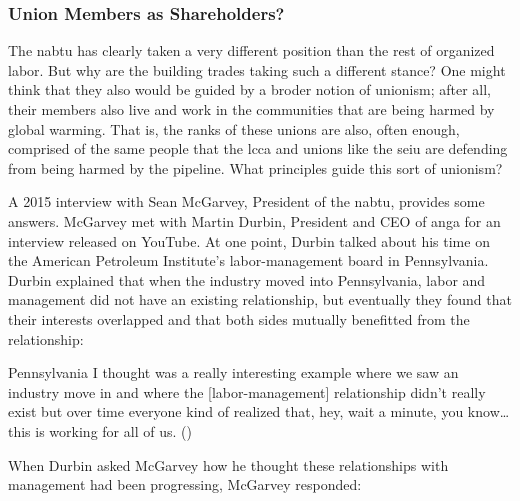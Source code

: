 \documentclass[12pt]{article}
\renewenvironment{quote}
  {\list{}{\leftmargin=\parindent\rightmargin=0pt}%
   \item\relax}
  {\endlist}
\begin{document}
\subsubsection{Union Members as Shareholders?}

The \acrfull{nabtu} has clearly taken a very different position than the rest of organized labor. But why are the building trades taking such a different stance? One might think that they also would be guided by a broder notion of unionism; after all, their members also live and work in the communities that are being harmed by global warming. That is, the ranks of these unions are also, often enough, comprised of the same people that the \acrshort{lcca} and unions like the \acrshort{seiu} are defending from being harmed by the pipeline. What principles guide this sort of unionism?

A 2015 interview with Sean McGarvey, President of the \acrshort{nabtu}, provides some answers. McGarvey met with Martin Durbin, President and CEO of \acrfull{anga} for an interview released on YouTube. At one point, Durbin talked about his time on the American Petroleum Institute’s labor-management board in Pennsylvania. Durbin explained that when the industry moved into Pennsylvania, labor and management did not have an existing relationship, but eventually they found that their interests overlapped and that both sides mutually benefitted from the relationship:

\begin{quote}
Pennsylvania I thought was a really interesting example where we saw an industry move in and where the [labor-management] relationship didn't really exist but over time everyone kind of realized that, hey, wait a minute, you know\ldots this is working for all of us. (\cite{natgasnowNextInfrastructureChallenge2015})
\end{quote}

\noindent When Durbin asked McGarvey how he thought these relationships with management had been progressing, McGarvey responded:
\end{document}
